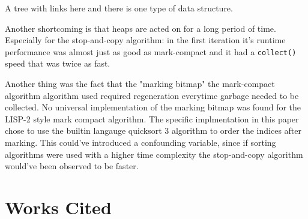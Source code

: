 \documentclass[index]{subfiles}
\begin{document}
A tree with links here and there is one type of data structure. 

Another shortcoming is that heaps are acted on for a long period of time. Especially for the stop-and-copy algorithm: in the first iteration it's runtime performance was almost just as good as mark-compact and it had a \verb+collect()+ speed that was twice as fast.

Another thing was the fact that the "marking bitmap" the mark-compact algorithm algorithm used required regeneration everytime garbage needed to be collected. No universal implementation of the marking bitmap was found for the LISP-2 style mark compact algorithm. The specific implmentation in this paper chose to use the builtin langauge quicksort 3 algorithm to order the indices after marking. This could've introduced a confounding variable, since if sorting algorithms were used with a higher time complexity the stop-and-copy algorithm would've been observed to be faster.




\section{Works Cited}

\printbibliography
\end{document}
